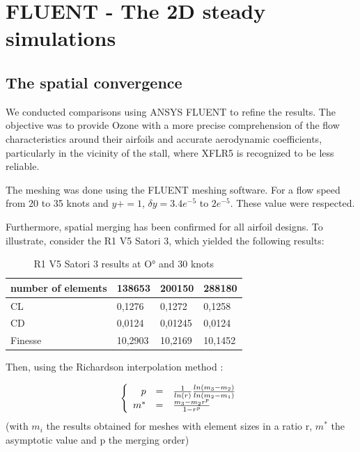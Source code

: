 
\section{FLUENT - The 2D steady simulations}
\label{sec:Ch1.6}


\subsection{The spatial convergence}
\label{sub:Ch1.6.1}

We conducted comparisons using ANSYS FLUENT to refine the results. The objective was to provide Ozone with a more precise comprehension of the flow characteristics around their airfoils and accurate aerodynamic coefficients, particularly in the vicinity of the stall, where XFLR5 is recognized to be less reliable. 

The meshing was done using the FLUENT meshing software. For a flow speed from 20 to 35 knots and $y{+} = 1$, $\delta y = 3.4e^{-5}$ to $2e^{-5}$. These value were respected.

Furthermore, spatial merging has been confirmed for all airfoil designs. To illustrate, consider the R1 V5 Satori 3, which yielded the following results: 

\begin{table}[H]
    \center
    \begin{tabular}{|l|l|l|l|}
        \hline
        number of elements & 138653 & 200150 & 288180 \tabularnewline
        \hline
        CL & 0,1276 & 0,1272 & 0,1258  \tabularnewline
        \hline
        CD & 0,0124 & 0,01245 & 0,0124  \tabularnewline
        \hline
        Finesse & 10,2903 & 10,2169 & 10,1452  \tabularnewline
        \hline
    \end{tabular}
    \caption{R1 V5 Satori 3 results at O° and 30 knots}
    \label{tab:R1_V5_results_at_O°_and_35_knots}
\end{table}

Then, using the Richardson interpolation method \cite{RichardsonInterpolation}:

\begin{equation}
\left \{
   \begin{array}{r c l}
      p  & = & \frac{1}{ln(r)} \frac{ln(m_{3}-m_{2})}{ln(m_{2}-m_{1})} \\
      m^{*}   & = & \frac{m_{3}-m_{2}r^{p}}{1-r^{p}} \\
   \end{array}
   \right .
   \label{Richardson_interpolation}
\end{equation}
(with $m_{i}$ the results obtained for meshes with element sizes in a ratio r, $m^{*}$ the asymptotic value and p the merging order)

